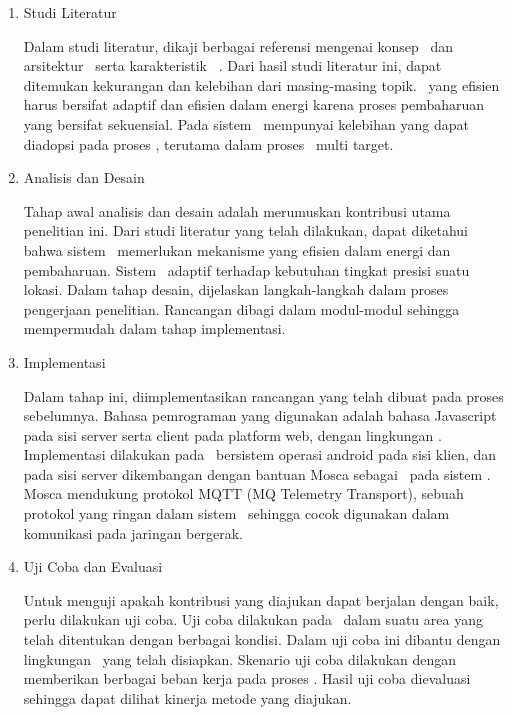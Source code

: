 \begin{enumerate}
  [noitemsep,
  nolistsep,
  leftmargin=0cm,
  itemindent=.5cm,
  listparindent=\parindent]

  \item Studi Literatur

    Dalam studi literatur, dikaji berbagai referensi mengenai konsep
    \tracking~dan arsitektur \pubsub~serta karakteristik \context~\aware. Dari
    hasil studi literatur ini, dapat ditemukan kekurangan dan kelebihan dari
    masing-masing topik. \Tracking~yang efisien harus bersifat adaptif dan
    efisien dalam energi karena proses pembaharuan yang bersifat sekuensial.
    Pada sistem \pubsub~mempunyai kelebihan yang dapat diadopsi pada proses
    \tracking, terutama dalam proses \tracking~multi target.

  \item Analisis dan Desain

    Tahap awal analisis dan desain adalah merumuskan kontribusi utama penelitian
    ini.  Dari studi literatur yang telah dilakukan, dapat diketahui bahwa
    sistem \tracking~memerlukan mekanisme yang efisien dalam energi dan
    pembaharuan.  Sistem \tracking~adaptif terhadap kebutuhan tingkat presisi
    suatu lokasi.  Dalam tahap desain, dijelaskan langkah-langkah dalam proses
    pengerjaan penelitian.  Rancangan dibagi dalam modul-modul sehingga
    mempermudah dalam tahap implementasi.

  \item Implementasi

    Dalam tahap ini, diimplementasikan rancangan yang telah dibuat pada proses
    sebelumnya.  Bahasa pemrograman yang digunakan adalah bahasa Javascript pada
    sisi server serta client pada platform web, dengan lingkungan \nodejs.
    Implementasi dilakukan pada \smartphone~bersistem operasi android pada sisi
    klien, dan pada sisi server dikembangan dengan bantuan Mosca sebagai
    \broker~pada sistem \pubsub. Mosca mendukung protokol MQTT (MQ Telemetry
    Transport), sebuah protokol yang ringan dalam sistem \pubsub~sehingga cocok
    digunakan dalam komunikasi pada jaringan bergerak.

  \item Uji Coba dan Evaluasi

    Untuk menguji apakah kontribusi yang diajukan dapat berjalan dengan baik,
    perlu dilakukan uji coba. Uji coba dilakukan pada \smartphone~dalam suatu
    area yang telah ditentukan dengan berbagai kondisi. Dalam uji coba ini
    dibantu dengan lingkungan \testbed~yang telah disiapkan. Skenario uji coba
    dilakukan dengan memberikan berbagai beban kerja pada proses \tracking.
    Hasil uji coba dievaluasi sehingga dapat dilihat kinerja metode yang
    diajukan.


\end{enumerate}
